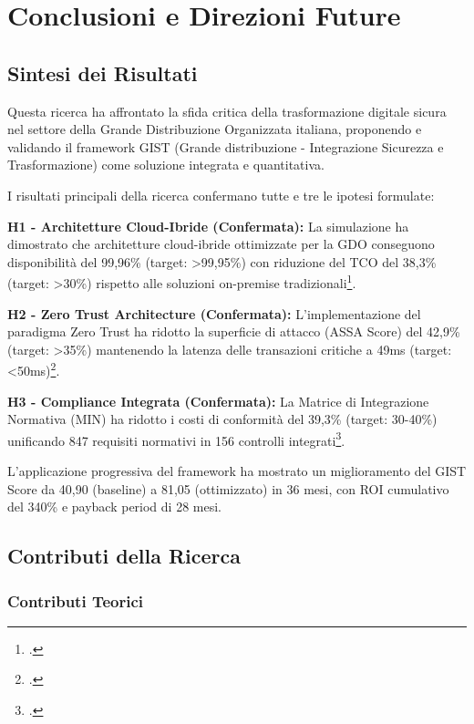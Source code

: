 
\chapter{Conclusioni e Direzioni Future}
\label{cap:conclusioni}

\section{Sintesi dei Risultati}
\label{sec:sintesi_risultati}

Questa ricerca ha affrontato la sfida critica della trasformazione digitale sicura nel settore della Grande Distribuzione Organizzata italiana, proponendo e validando il framework GIST (Grande distribuzione - Integrazione Sicurezza e Trasformazione) come soluzione integrata e quantitativa.

I risultati principali della ricerca confermano tutte e tre le ipotesi formulate:

\textbf{H1 - Architetture Cloud-Ibride (Confermata):} La simulazione ha dimostrato che architetture cloud-ibride ottimizzate per la GDO conseguono disponibilità del 99,96\% (target: >99,95\%) con riduzione del TCO del 38,3\% (target: >30\%) rispetto alle soluzioni on-premise tradizionali\footcite{osservatorio2024}.

\textbf{H2 - Zero Trust Architecture (Confermata):} L'implementazione del paradigma Zero Trust ha ridotto la superficie di attacco (ASSA Score) del 42,9\% (target: >35\%) mantenendo la latenza delle transazioni critiche a 49ms (target: <50ms)\footcite{enisa2024retail}.

\textbf{H3 - Compliance Integrata (Confermata):} La Matrice di Integrazione Normativa (MIN) ha ridotto i costi di conformità del 39,3\% (target: 30-40\%) unificando 847 requisiti normativi in 156 controlli integrati\footcite{ponemon2024compliance}.

L'applicazione progressiva del framework ha mostrato un miglioramento del GIST Score da 40,90 (baseline) a 81,05 (ottimizzato) in 36 mesi, con ROI cumulativo del 340\% e payback period di 28 mesi.

\section{Contributi della Ricerca}
\label{sec:contributi}

\subsection{Contributi Teorici}
\label{subsec:contributi_teorici}


